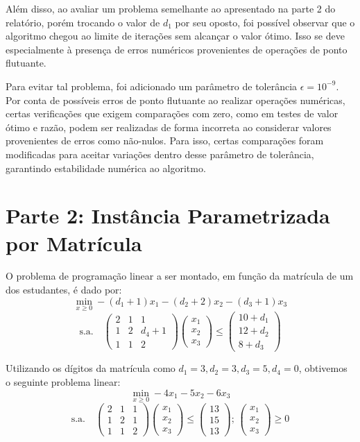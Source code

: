 \documentclass[12pt]{article}
\begin{document}
Além disso, ao avaliar um problema semelhante ao apresentado na parte 2 do relatório, porém trocando o valor de $d_1$ por seu oposto, foi possível observar que o algoritmo chegou ao limite de iterações sem alcançar o valor ótimo. Isso se deve especialmente à presença de erros numéricos provenientes de operações de ponto flutuante.

Para evitar tal problema, foi adicionado um parâmetro de tolerância $\epsilon=10^{-9}$. Por conta de possíveis erros de ponto flutuante ao realizar operações numéricas, certas verificações que exigem comparações com zero, como em testes de valor ótimo e razão, podem ser realizadas de forma incorreta ao considerar valores provenientes de erros como não-nulos. Para isso, certas comparações foram modificadas para aceitar variações dentro desse parâmetro de tolerância, garantindo estabilidade numérica ao algoritmo.

\section*{Parte 2: Instância Parametrizada por Matrícula}
O problema de programação linear a ser montado, em função da matrícula de um dos estudantes, é dado por:
$$
\min_{x\geq0}-(d_1+1)x_1-(d_2+2)x_2-(d_3+1)x_3
$$
$$\text{s.a.}\quad
\begin{pmatrix}
2 & 1 & 1\\
1 & 2 & d_4+1\\
1 & 1 & 2
\end{pmatrix}
\begin{pmatrix}
x_1\\x_2\\x_3
\end{pmatrix}
\leq
\begin{pmatrix}
10+d_1\\12+d_2\\8+d_3
\end{pmatrix}
$$

Utilizando os dígitos da matrícula como $d_1=3,d_2=3,d_3=5,d_4=0$, obtivemos o seguinte problema linear:
$$
\min_{x\geq0}-4x_1-5x_2-6x_3
$$
$$\text{s.a.}\quad
\begin{pmatrix}
2 & 1 & 1\\
1 & 2 & 1\\
1 & 1 & 2
\end{pmatrix}
\begin{pmatrix}
x_1\\x_2\\x_3
\end{pmatrix}
\leq
\begin{pmatrix}
13\\15\\13
\end{pmatrix};\,
\begin{pmatrix}
x_1\\x_2\\x_3
\end{pmatrix}
\geq0
$$
\end{document}
